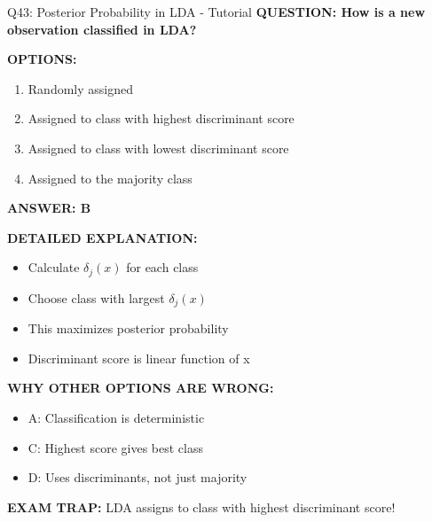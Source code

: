 \documentclass[8pt]{beamer}
\begin{document}
	\begin{frame}{Q43: Posterior Probability in LDA - Tutorial}
		\fontsize{6.5}{7.5}\selectfont
		\textbf{QUESTION: How is a new observation classified in LDA?}
		
		\vspace{0.1cm}
		\textbf{OPTIONS:}
		\begin{enumerate}
			\item Randomly assigned
			\item Assigned to class with highest discriminant score
			\item Assigned to class with lowest discriminant score
			\item Assigned to the majority class
		\end{enumerate}
		
		\vspace{0.1cm}
		\textcolor{myblue}{\textbf{ANSWER: B}}
		
		\vspace{0.1cm}
		\textbf{DETAILED EXPLANATION:}
		\begin{itemize}
			\item Calculate $\delta_j(x)$ for each class
			\item Choose class with largest $\delta_j(x)$
			\item This maximizes posterior probability
			\item Discriminant score is linear function of x
		\end{itemize}
		
		\vspace{0.1cm}
		\textcolor{myred}{\textbf{WHY OTHER OPTIONS ARE WRONG:}}
		\begin{itemize}
			\item \textcolor{myred}{A:} Classification is deterministic
			\item \textcolor{myred}{C:} Highest score gives best class
			\item \textcolor{myred}{D:} Uses discriminants, not just majority
		\end{itemize}
		
		\textcolor{myred}{\textbf{EXAM TRAP:}} LDA assigns to \textcolor{myblue}{class with highest discriminant score}!
	\end{frame}
	
\end{document}
